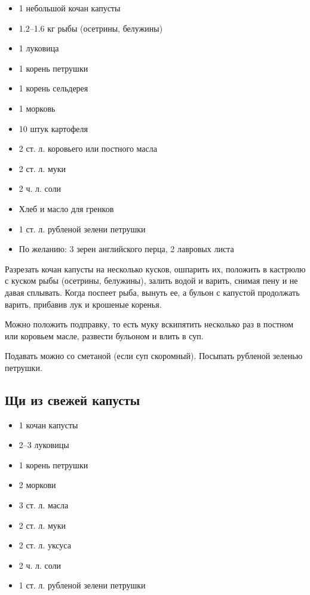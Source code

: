 \begin{itemize}
	\item 1 небольшой кочан капусты
    \item 1.2–1.6 кг рыбы (осетрины, белужины) 
    \item 1 луковица 
    \item 1 корень петрушки
    \item 1 корень сельдерея 
    \item 1 морковь
    \item 10 штук картофеля
    \item 2 ст. л. коровьего или постного масла 
    \item 2 ст. л. муки
    \item 2 ч. л. соли 
    \item Хлеб и масло для гренков
    \item 1 ст. л. рубленой зелени петрушки 
    \item По желанию: 3 зерен английского перца, 2 лавровых листа
\end{itemize}

Разрезать кочан капусты на несколько кусков, ошпарить их, положить в кастрюлю с куском рыбы (осетрины, белужины), залить водой и варить, снимая пену и не давая сплывать. Когда поспеет рыба, вынуть ее, а бульон с капустой продолжать варить, прибавив лук и крошеные коренья.

Можно положить подправку, то есть муку вскипятить несколько раз в постном или коровьем масле, развести бульоном и влить в суп.

Подавать можно со сметаной (если суп скоромный). Посыпать рубленой зеленью петрушки.

\subsection{Щи из свежей капусты}\label{10schi-svezh-kap}

\begin{itemize}
	\item 1 кочан капусты 
    \item 2–3 луковицы
    \item 1 корень петрушки
    \item 2 моркови
    \item 3 ст. л. масла
    \item 2 ст. л. муки 
    \item 2 ст. л. уксуса
    \item 2 ч. л. соли 
    \item 1 ст. л. рубленой зелени петрушки
\end{itemize}

